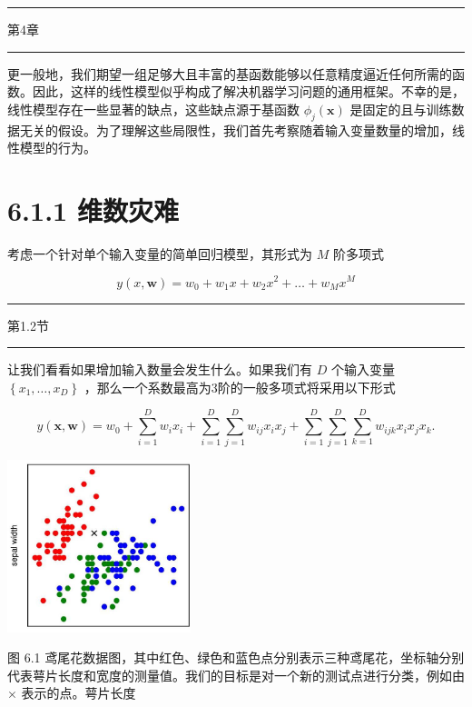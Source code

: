 \documentclass[10pt]{report}
\newcommand{\HRule}{\begin{center}\rule{0.9\linewidth}{0.2mm}\end{center}}
\begin{document}
\HRule

第4章

\HRule

更一般地，我们期望一组足够大且丰富的基函数能够以任意精度逼近任何所需的函数。因此，这样的线性模型似乎构成了解决机器学习问题的通用框架。不幸的是，线性模型存在一些显著的缺点，这些缺点源于基函数 \({\phi }_{j}\left( \mathbf{x}\right)\) 是固定的且与训练数据无关的假设。为了理解这些局限性，我们首先考察随着输入变量数量的增加，线性模型的行为。

\section*{6.1.1 维数灾难}

考虑一个针对单个输入变量的简单回归模型，其形式为 \(M\) 阶多项式

\[
y\left( {x,\mathbf{w}}\right)  = {w}_{0} + {w}_{1}x + {w}_{2}{x}^{2} + \ldots  + {w}_{M}{x}^{M} \tag{6.2}
\]

\HRule

第1.2节

\HRule

让我们看看如果增加输入数量会发生什么。如果我们有 \(D\) 个输入变量 \(\left\{  {{x}_{1},\ldots ,{x}_{D}}\right\}\) ，那么一个系数最高为3阶的一般多项式将采用以下形式

\[
y\left( {\mathbf{x},\mathbf{w}}\right)  = {w}_{0} + \mathop{\sum }\limits_{{i = 1}}^{D}{w}_{i}{x}_{i} + \mathop{\sum }\limits_{{i = 1}}^{D}\mathop{\sum }\limits_{{j = 1}}^{D}{w}_{ij}{x}_{i}{x}_{j} + \mathop{\sum }\limits_{{i = 1}}^{D}\mathop{\sum }\limits_{{j = 1}}^{D}\mathop{\sum }\limits_{{k = 1}}^{D}{w}_{ijk}{x}_{i}{x}_{j}{x}_{k}. \tag{6.3}
\]

\begin{center}
\includegraphics[max width=0.4\textwidth]{images/0194e279-9b28-703a-88f4-c3ac21e2010d_192_946_344_602_565_0.jpg}
\end{center}
\hspace*{3em} 

图 6.1 鸢尾花数据图，其中红色、绿色和蓝色点分别表示三种鸢尾花，坐标轴分别代表萼片长度和宽度的测量值。我们的目标是对一个新的测试点进行分类，例如由 \(\times\) 表示的点。萼片长度
\end{document}

